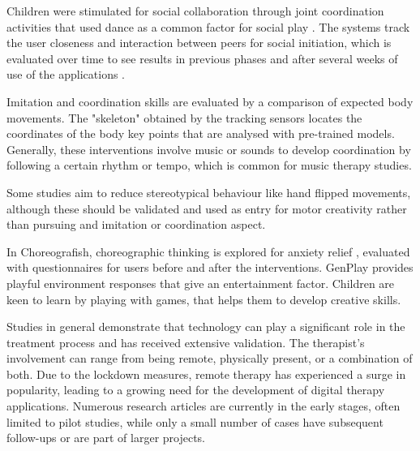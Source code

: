 \documentclass[a4paper,fleqn]{cas-sc}
\begin{document}
Children were stimulated for social collaboration through joint coordination activities that used dance as a common factor for social play \cite{Raygoza-Romero21, Osmosis20, Zampella21} . The systems track the user closeness and interaction between peers for social initiation, which is evaluated over time to see results in previous phases and after several weeks of use of the applications \cite{Osmosis20}.


Imitation and coordination skills are evaluated by a comparison of expected body movements. The "skeleton" obtained by the tracking sensors locates the coordinates of the body key points that are analysed with pre-trained models. Generally, these interventions involve music or sounds to develop coordination by following a certain rhythm or tempo, which is common for music therapy studies.

Some studies aim to reduce stereotypical behaviour like hand flipped movements, although these should be validated and used as entry for motor creativity rather than pursuing and imitation or coordination aspect.
 
In Choreografish, choreographic thinking is explored for anxiety relief \cite{AltizerJr18}, evaluated with questionnaires for users before and after the interventions. GenPlay provides playful environment responses \cite{Crowell18} that give an entertainment factor. Children are keen to learn by playing with games, that helps them to develop creative skills.


Studies in general demonstrate that technology can play a significant role in the treatment process and has received extensive validation. The therapist's involvement can range from being remote, physically present, or a combination of both. Due to the lockdown measures, remote therapy has experienced a surge in popularity, leading to a growing need for the development of digital therapy applications. Numerous research articles are currently in the early stages, often limited to pilot studies, while only a small number of cases have subsequent follow-ups or are part of larger projects.
\end{document}
